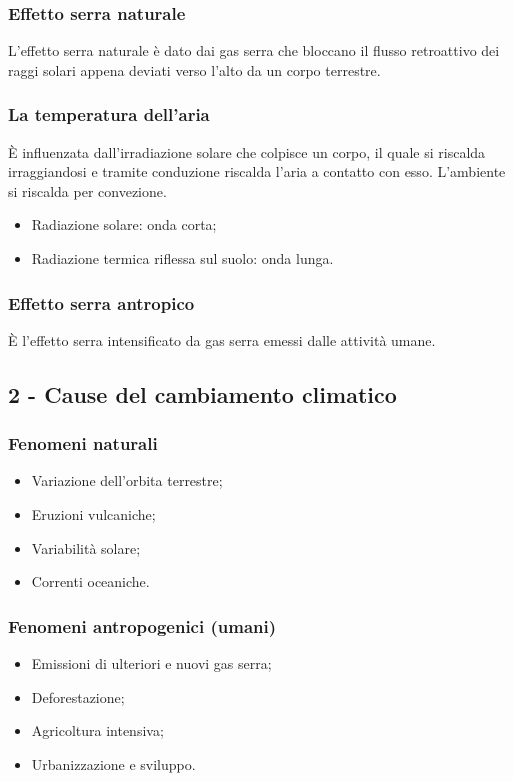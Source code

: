 \documentclass{article}
\begin{document}
\subsubsection{Effetto serra naturale}
L'effetto serra naturale è dato dai gas serra che bloccano il flusso retroattivo dei raggi
solari appena deviati verso l'alto da un corpo terrestre.

\subsubsection{La temperatura dell'aria}
È influenzata dall'irradiazione solare che colpisce un corpo, il quale si riscalda irraggiandosi
e tramite conduzione riscalda l'aria a contatto con esso. L'ambiente si riscalda per convezione.
\begin{itemize}
    \item Radiazione solare: onda corta;
    \item Radiazione termica riflessa sul suolo: onda lunga.
\end{itemize}

\subsubsection{Effetto serra antropico}
È l'effetto serra intensificato da gas serra emessi dalle attività umane.

\subsection{2 - Cause del cambiamento climatico}
\subsubsection{Fenomeni naturali}
\begin{itemize}
    \item Variazione dell'orbita terrestre;
    \item Eruzioni vulcaniche;
    \item Variabilità solare;
    \item Correnti oceaniche.
\end{itemize}

\subsubsection{Fenomeni antropogenici (umani)}
\begin{itemize}
    \item Emissioni di ulteriori e nuovi gas serra;
    \item Deforestazione;
    \item Agricoltura intensiva;
    \item Urbanizzazione e sviluppo.
\end{itemize}
\end{document}
